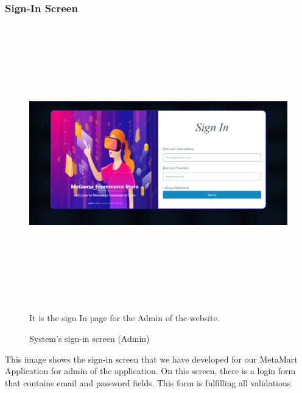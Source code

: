\subsubsection{Sign-In Screen}
\begin{figure}[H]
    \centering
    \includegraphics[width=15cm,height=12cm]{Figures/Diagrams/SignIn.PNG}
    \caption{System’s sign-in screen (Admin)}
    \label{System’s sign-in screen (Admin)}
    It is the sign In page for the Admin of the website.
\end{figure}
\justifying
This image shows the sign-in screen that we have developed for our MetaMart Application for admin of the application. On this screen, there is a login form that contains email and password fields. This form is fulfilling all validations.
